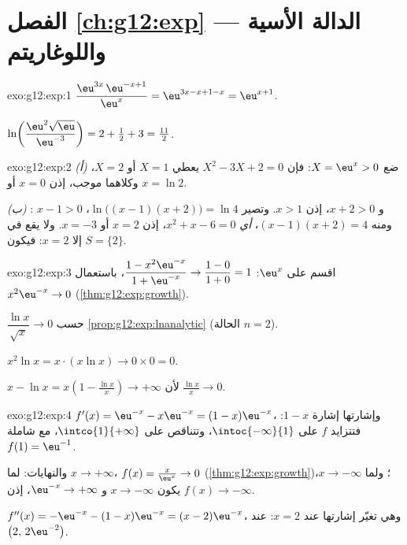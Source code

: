 \section*{الفصل \ref{ch:g12:exp} --- الدالة الأسية واللوغاريتم}

\begin{solution}{exo:g12:exp:1}
$\dfrac{\eu^{3x}\,\eu^{-x+1}}{\eu^{x}} = \eu^{3x - x + 1 - x} = \eu^{x+1}$.

$\ln\!\left(\dfrac{\eu^2\sqrt{\eu}}{\eu^{-3}}\right)
= 2 + \tfrac12 + 3 = \tfrac{11}{2}$.
\end{solution}

\begin{solution}{exo:g12:exp:2}
\emph{(أ)} ضع $X = \eu^x > 0$: فإن $X^2 - 3X + 2 = 0$ يعطي $X = 1$ أو $X = 2$،
وكلاهما موجب، إذن $x = 0$ أو $x = \ln 2$.

\emph{(ب)} : $x - 1 > 0$ و $x + 2 > 0$، إذن $x > 1$. وتصير 
$\ln\bigl((x-1)(x+2)\bigr) = \ln 4$، ومنه $(x-1)(x+2) = 4$،
\emph{أي} $x^2 + x - 6 = 0$، إذن $x = 2$ أو $x = -3$. ولا يقع في 
إلا $x = 2$: فيكون $S = \{2\}$.
\end{solution}

\begin{solution}{exo:g12:exp:3}
اقسم على $\eu^x$:
$\dfrac{1 - x^2\eu^{-x}}{1 + \eu^{-x}} \to \dfrac{1-0}{1+0} = 1$، باستعمال
$x^2 \eu^{-x} \to 0$ (\cref{thm:g12:exp:growth}).

$\dfrac{\ln x}{\sqrt x} \to 0$ حسب \cref{prop:g12:exp:lnanalytic} (الحالة
$n = 2$).

$x^2 \ln x = x \cdot (x \ln x) \to 0 \times 0 = 0$.

$x - \ln x = x\left(1 - \frac{\ln x}{x}\right) \to +\infty$ لأن
$\frac{\ln x}{x} \to 0$.
\end{solution}

\begin{solution}{exo:g12:exp:4}
$f'(x) = \eu^{-x} - x\eu^{-x} = (1 - x)\eu^{-x}$، وإشارتها إشارة $1 - x$:
فتتزايد $f$ على $\intoc{-\infty}{1}$، وتتناقص على $\intco{1}{+\infty}$،
مع  شاملة $f(1) = \eu^{-1}$.

والنهايات: لما $x \to +\infty$، $f(x) = \frac{x}{\eu^x} \to 0$
(\cref{thm:g12:exp:growth})؛ ولما $x \to -\infty$، يكون $x \to -\infty$ و
$\eu^{-x} \to +\infty$، إذن $f(x) \to -\infty$.

$f''(x) = -\eu^{-x} - (1-x)\eu^{-x} = (x - 2)\eu^{-x}$، وهي تغيّر إشارتها عند
$x = 2$:  عند $\bigl(2,\, 2\eu^{-2}\bigr)$.
\end{solution}

